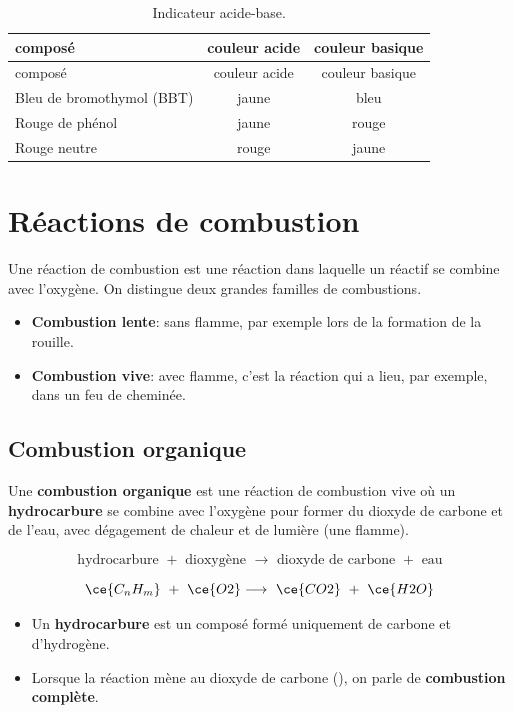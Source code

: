 \documentclass[
  11pt,
  french,
  a4paper,
  openany]{book}
\providecommand{\tightlist}{%
  \setlength{\itemsep}{0pt}\setlength{\parskip}{0pt}}
\begin{document}
\begin{longtable}[]{@{}lcc@{}}
\caption{\label{tab:indicateur-acide-base} Indicateur acide-base.}\tabularnewline
\toprule
composé & couleur acide & couleur basique\tabularnewline
\midrule
\endfirsthead
\toprule
composé & couleur acide & couleur basique\tabularnewline
\midrule
\endhead
Bleu de bromothymol (BBT) & jaune & bleu\tabularnewline
Rouge de phénol & jaune & rouge\tabularnewline
Rouge neutre & rouge & jaune\tabularnewline
\bottomrule
\end{longtable}

\hypertarget{ruxe9actions-de-combustion}{%
\section{Réactions de combustion}\label{ruxe9actions-de-combustion}}

Une réaction de combustion est une réaction dans laquelle un réactif se combine avec l'oxygène. On distingue deux grandes familles de combustions.

\begin{itemize}
\tightlist
\item
  \textbf{Combustion lente}: sans flamme, par exemple lors de la formation de la rouille.
\item
  \textbf{Combustion vive}: avec flamme, c'est la réaction qui a lieu, par exemple, dans un feu de cheminée.
\end{itemize}

\hypertarget{combustion-organique}{%
\subsection{Combustion organique}\label{combustion-organique}}

Une \textbf{combustion organique} est une réaction de combustion vive où un \textbf{hydrocarbure} se combine avec l'oxygène pour former du dioxyde de carbone et de l'eau, avec dégagement de chaleur et de lumière (une flamme).

\[ \text{hydrocarbure } + \text{ dioxygène } \longrightarrow \text{ dioxyde de carbone } + \text{ eau} \]

\[ \ce{C_{n}H_{m}}\ +\ \ce{O2} \longrightarrow\ \ce{CO2}\ +\ \ce{H2O} \]

\begin{itemize}
\tightlist
\item
  Un \textbf{hydrocarbure} est un composé formé uniquement de carbone et d'hydrogène.
\item
  Lorsque la réaction mène au dioxyde de carbone (), on parle de \textbf{combustion complète}.
\end{itemize}
\end{document}

